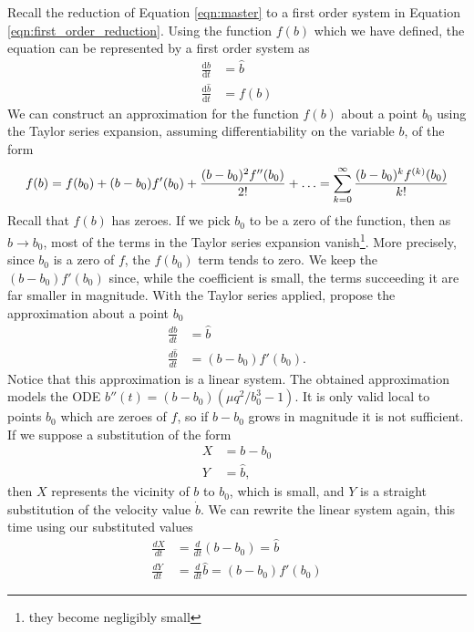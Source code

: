\documentclass{article}
\begin{document}
Recall the reduction of Equation \ref{eqn:master} to a first order system in Equation \ref{eqn:first_order_reduction}.
Using the function $f(b)$ which we have defined, the equation can be represented by a first order system as
\begin{align}
    \frac{\mathrm{d}b}{\mathrm{d}t} &= \hat{b} \\
    \frac{\mathrm{d}\hat{b}}{\mathrm{d}t} & = f(b)
    \label{eqn:first_order_modified}
\end{align}
We can construct an approximation for the function $f(b)$ about a point $b_0$ using the Taylor series expansion, assuming differentiability on the variable $b$, of the form
\begin{equation}
    f(b) = f(b_0) + (b-b_0)f'(b_0) + \frac{(b-b_0)^2 f''(b_0)}{2!} + \mathellipsis = \sum_{k=0}^\infty\frac{(b-b_0)^{k}f^{(k)}(b_0)}{k!}
    \label{eqn:taylor_series}
\end{equation}
Recall that $f(b)$ has zeroes. If we pick $b_0$ to be a zero of the function, then as $b\rightarrow b_0$,
most of the terms in the Taylor series expansion vanish\footnote{they become negligibly small}.
More precisely, since $b_0$ is a zero of $f$, the $f(b_0)$ term tends to zero.
We keep the $(b-b_0)f'(b_0)$ since, while the coefficient is small,
the terms succeeding it are far smaller in magnitude.
With the Taylor series applied, propose the approximation about a point $b_0$
\begin{align}
    \frac{db}{dt}       & = \hat{b}         \\
    \frac{d\hat{b}}{dt} & = (b-b_0)f'(b_0).
    \label{eqn:first_order_approximated}
\end{align}
Notice that this approximation is a linear system. The obtained approximation models the ODE $b''(t) = (b-b_0)(\mu q^2/b_0^3-1)$.
It is only valid local to points $b_0$ which are zeroes of $f$, so if $b-b_0$ grows in magnitude it is not sufficient.
If we suppose a substitution of the form
\begin{align}
    X & = b - b_0  \\
    Y & = \hat{b},
\end{align}
then $X$ represents the vicinity of $b$ to $b_0$, which is small,
and $Y$ is a straight substitution of the velocity value $\dot{b}$.
We can rewrite the linear system again, this time using our substituted values
\begin{align}
    \frac{dX}{dt} & = \frac{d}{dt}\left(b-b_0\right) = \hat{b} \\
    \frac{dY}{dt} & = \frac{d}{dt}\hat{b} = (b-b_0)f'(b_0)
\end{align}
\end{document}
